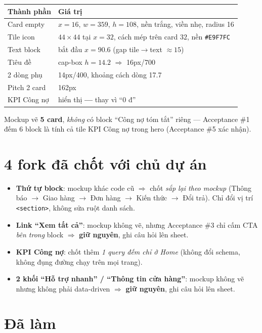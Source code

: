 \begin{center}
\begin{tabular}{ll}
\hline
\textbf{Thành phần} & \textbf{Giá trị} \\
\hline
Card empty & $x=16$, $w=359$, $h=108$, nền trắng, viền nhẹ, radius 16 \\
Tile icon & $44\times44$ tại $x=32$, cách mép trên card $32$, nền \texttt{\#E9F7FC} \\
Text block & bắt đầu $x=90.6$ (gap tile$\rightarrow$text $\approx15$) \\
Tiêu đề & cap-box $h=14.2$ $\Rightarrow$ 16px/700 \\
2 dòng phụ & 14px/400, khoảng cách dòng 17.7 \\
Pitch 2 card & 162px \\
KPI Công nợ & hiển thị \textbf{---} thay vì ``0 đ'' \\
\hline
\end{tabular}
\end{center}

Mockup vẽ \textbf{5 card}, \emph{không} có block ``Công nợ tóm tắt'' riêng --- Acceptance \#1 đếm
6 block là tính cả tile KPI Công nợ trong hero (Acceptance \#5 xác nhận).

\section{4 fork đã chốt với chủ dự án}

\begin{itemize}
  \item \textbf{Thứ tự block}: mockup khác code cũ $\Rightarrow$ chốt \emph{sắp lại theo mockup}
    (Thông báo $\rightarrow$ Giao hàng $\rightarrow$ Đơn hàng $\rightarrow$ Kiến thức
    $\rightarrow$ Đổi trả). Chỉ đổi vị trí \texttt{<section>}, không sửa ruột danh sách.
  \item \textbf{Link ``Xem tất cả''}: mockup không vẽ, nhưng Acceptance \#3 chỉ cấm CTA
    \emph{bên trong} block $\Rightarrow$ \textbf{giữ nguyên}, ghi câu hỏi lên sheet.
  \item \textbf{KPI Công nợ}: chốt thêm \emph{1 query đếm chỉ ở Home} (không đổi schema, không
    đụng đường chạy trên mọi trang).
  \item \textbf{2 khối ``Hỗ trợ nhanh'' / ``Thông tin cửa hàng''}: mockup không vẽ nhưng không
    phải data-driven $\Rightarrow$ \textbf{giữ nguyên}, ghi câu hỏi lên sheet.
\end{itemize}

\section{Đã làm}

